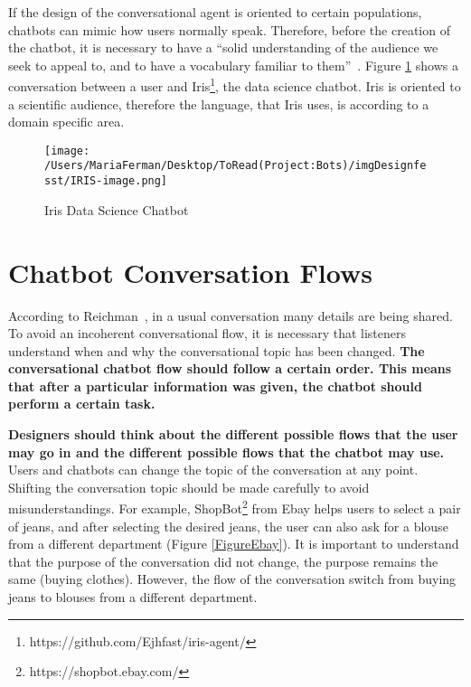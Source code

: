 \documentclass[a4paper,10pt]{article}
\begin{document}
 If the design of the conversational agent is oriented to certain populations, chatbots can mimic how users normally speak.  Therefore, before the creation of the chatbot, it is necessary to have a ``solid understanding of the audience we seek to appeal to, and to have a vocabulary familiar to them”~\cite{HeuristicsWebPage}. Figure \ref{FigureIRIS} shows a conversation between a user and Iris\footnote{https://github.com/Ejhfast/iris-agent/}, the data science chatbot. Iris is oriented to a scientific audience, therefore the language, that Iris uses, is according to a domain specific area.  

\begin{figure}
\centering
\texttt{[image: /Users/MariaFerman/Desktop/ToRead(Project:Bots)/imgDesignfesst/IRIS-image.png]}
\caption{Iris Data Science Chatbot}
\label{FigureIRIS}
\end{figure}
\section{Chatbot Conversation Flows}
According to Reichman~\cite{reichman1985getting}, in a usual conversation many details are being shared. To avoid an incoherent conversational flow, it is necessary that listeners understand when and why the conversational topic has been changed. \textbf{The conversational chatbot flow should follow a certain order. This means that after a particular information was given, the chatbot should perform a certain task.} 

\textbf{Designers should think about the different possible flows that the user may go in and the different possible flows that the chatbot may use.} Users and chatbots can change the topic of the conversation at any point. Shifting the conversation topic should be made carefully to avoid misunderstandings. For example, ShopBot\footnote{https://shopbot.ebay.com/} from Ebay helps users to select a pair of jeans, and after selecting the desired jeans, the user can also ask for a blouse from a different department (Figure \ref{FigureEbay}). It is important to understand that the purpose of the conversation did not change, the purpose remains the same (buying clothes). However, the flow of the conversation switch from buying jeans to blouses from a different department.
\end{document}
